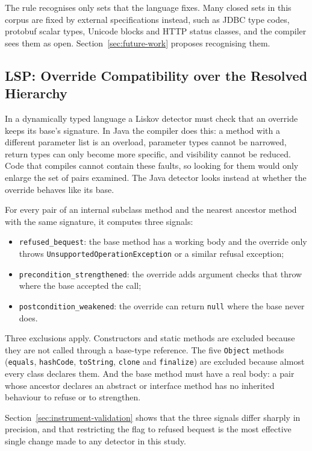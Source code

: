 The rule recognises only sets that the language fixes. Many closed sets in this corpus are fixed by
external specifications instead, such as JDBC type codes, protobuf scalar types, Unicode blocks and
HTTP status classes, and the compiler sees them as open. Section~\ref{sec:future-work} proposes
recognising them.

\subsection{LSP: Override Compatibility over the Resolved Hierarchy}

In a dynamically typed language a Liskov detector must check that an override keeps its base's
signature. In Java the compiler does this: a method with a different parameter list is an overload,
parameter types cannot be narrowed, return types can only become more specific, and visibility cannot
be reduced. Code that compiles cannot contain these faults, so looking for them would only enlarge
the set of pairs examined. The Java detector looks instead at whether the override behaves like its
base.

For every pair of an internal subclass method and the nearest ancestor method with the same
signature, it computes three signals:

\begin{itemize}
  \item \texttt{refused\_bequest}: the base method has a working body and the override only throws
  \texttt{UnsupportedOperationException} or a similar refusal exception;
  \item \texttt{precondition\_strengthened}: the override adds argument checks that throw where the
  base accepted the call;
  \item \texttt{postcondition\_weakened}: the override can return \texttt{null} where the base never
  does.
\end{itemize}

Three exclusions apply. Constructors and static methods are excluded because they are not called
through a base-type reference. The five \texttt{Object} methods (\texttt{equals}, \texttt{hashCode},
\texttt{toString}, \texttt{clone} and \texttt{finalize}) are excluded because almost every class
declares them. And the base method must have a real body: a pair whose ancestor declares an abstract
or interface method has no inherited behaviour to refuse or to strengthen.

Section~\ref{sec:instrument-validation} shows that the three signals differ sharply in precision,
and that restricting the flag to refused bequest is the most effective single change made to any
detector in this study.

